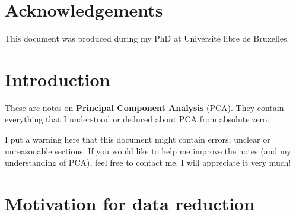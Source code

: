 \documentclass[20pt,twocolumn]{article}
\begin{document}

\vspace{10mm}

\setlength{\parindent}{0cm}

\section*{Acknowledgements}

This document was produced during my PhD at Université libre de Bruxelles.

\section{Introduction}

These are notes on \textbf{Principal Component Analysis} (PCA). They contain everything that I understood or deduced about PCA from absolute zero.

I put a warning here that this document might contain errors, unclear or unreasonable sections. If you would like to help me improve the notes (and my understanding of PCA), feel free to contact me. I will appreciate it very much!

\section{Motivation for data reduction}
\end{document}
